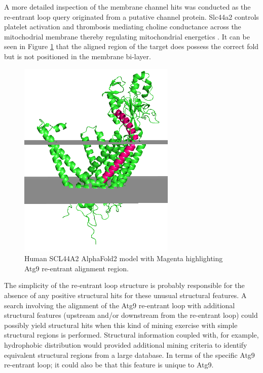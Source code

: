 A more detailed inspection of the membrane channel hits was conducted as the re-entrant loop query originated from a putative channel protein. Slc44a2 controls platelet activation and thrombosis  mediating choline conductance across the mitochodrial membrane thereby regulating mitochondrial energetics \cite{bennett2020choline}. It can be seen in Figure \ref{fig:atg9_rent_hit} that the aligned region of the target does possess the correct fold but is not positioned in the membrane bi-layer. 


\begin{figure}[th!]
    \centering
    \includegraphics[width=75mm, scale=0.75]{Pfam/atg9_rent aln.png}
    \caption{Human SCL44A2 AlphaFold2 model with Magenta highlighting Atg9 re-entrant alignment region.}
    \label{fig:atg9_rent_hit}
    \small
\end{figure}

The simplicity of the re-entrant loop structure is probably responsible for the absence of any positive structural hits for these unusual structural features. A search involving the alignment of the Atg9 re-entrant loop with additional structural features (upstream and/or downstream from the re-entrant loop) could possibly yield structural hits when this kind of mining exercise with simple structural regions is performed. Structural information coupled with, for example, hydrophobic distribution would provided additional mining criteria to identify equivalent structural regions from a large database.  In terms of the specific Atg9 re-entrant loop; it could also be that this feature is unique to Atg9.


